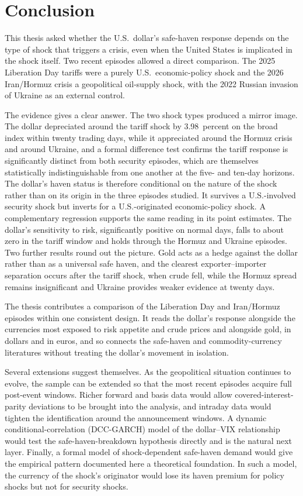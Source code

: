 
\chapter{Conclusion}
\label{ch:conclusion}

This thesis asked whether the U.S.\ dollar's safe-haven response depends on the type of
shock that triggers a crisis, even when the United States is implicated in the shock itself.
Two recent episodes allowed a direct comparison. The 2025 Liberation Day tariffs were a purely U.S.\ economic-policy shock and the 2026 Iran/Hormuz crisis a geopolitical oil-supply shock, with the 2022 Russian invasion of Ukraine as an external control.

The evidence gives a clear answer. The two shock types produced a mirror image. The dollar
depreciated around the tariff shock by 3.98~percent on the broad index within twenty
trading days, while it appreciated around the Hormuz crisis and around Ukraine, and a formal
difference test confirms the tariff response is significantly distinct from both security
episodes, which are themselves statistically indistinguishable from one another at the five- and ten-day
horizons. The dollar's haven status is therefore conditional on the nature of the shock rather than on its origin in the three episodes studied. It survives a U.S.-involved security shock but inverts for a U.S.-originated economic-policy shock. A complementary regression supports the same reading in its point estimates. The dollar's sensitivity to risk, significantly positive on normal days, falls to about zero in the tariff window and holds through the Hormuz and Ukraine episodes. Two further results round out the picture. Gold acts as a hedge against the dollar rather than as a universal safe haven, and the clearest exporter--importer separation occurs after the tariff shock, when crude fell, while the Hormuz spread remains insignificant and Ukraine provides weaker evidence at twenty days.

The thesis contributes a comparison of the Liberation Day and Iran/Hormuz episodes within one consistent design. It reads the dollar's response alongside the currencies most exposed to risk appetite and crude prices and alongside gold, in dollars and in euros, and so connects the safe-haven and commodity-currency literatures without treating the dollar's movement in isolation.

Several extensions suggest themselves. As the geopolitical situation continues to evolve, the
sample can be extended so that the most recent episodes acquire full post-event windows.
Richer forward and basis data would allow covered-interest-parity deviations to be brought
into the analysis, and intraday data would tighten the identification around the announcement
windows. A dynamic conditional-correlation (DCC-GARCH) model of the dollar--VIX relationship
would test the safe-haven-breakdown hypothesis directly and is the natural next layer.
Finally, a formal model of shock-dependent safe-haven demand would give the empirical pattern
documented here a theoretical foundation. In such a model, the currency of the
shock's originator would lose its haven premium for policy shocks but not for security
shocks.
